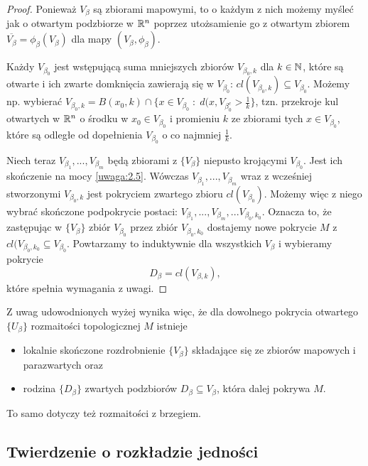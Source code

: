 \begin{proof}
  Ponieważ $V_\beta$ są zbiorami mapowymi, to o każdym z nich możemy myśleć jak o otwartym podzbiorze w $\mathbb{R}^n$ poprzez utożsamienie go z otwartym zbiorem $\overline{V_\beta}=\phi_\beta(V_\beta)$ dla mapy $(V_\beta, \phi_\beta)$.

  Każdy $V_{\beta_0}$ jest wstępującą suma mniejszych zbiorów $V_{\beta_0,k}$ dla $k\in\mathbb{N}$, które są otwarte i ich zwarte domknięcia zawierają się w $V_{\beta_0}$: $cl(V_{\beta_0,k})\subseteq V_{\beta_0}$. Możemy np. wybierać $V_{\beta_0,k}=B(x_0, k)\cap \{x\in V_{\beta_0}\;:\;d(x, V_{\beta_0^c}>\frac{1}{k}\}$, tzn. przekroje kul otwartych w $\mathbb{R}^n$ o środku w $x_0\in V_{\beta_0}$ i promieniu $k$ ze zbiorami tych $x\in V_{\beta_0}$, które są odległe od dopełnienia $V_{\beta_0}$ o co najmniej $\frac{1}{k}$.

  Niech teraz $V_{\beta_1},...,V_{\beta_m}$ będą zbiorami z $\{V_\beta\}$ niepusto krojącymi $V_{\beta_0}$. Jest ich skończenie na mocy \ref{uwaga:2.5}. Wówczas $V_{\beta_1},...,V_{\beta_m}$ wraz z wcześniej stworzonymi $V_{\beta_0,k}$ jest pokryciem zwartego zbioru $cl(V_{\beta_0})$. Możemy więc z niego wybrać skończone podpokrycie postaci: $V_{\beta_1},...,V_{\beta_m},...V_{\beta_0,k_0}$. Oznacza to, że zastępując w $\{V_\beta\}$ zbiór $V_{\beta_0}$ przez zbiór $V_{\beta_0, k_0}$ dostajemy nowe pokrycie $M$ z $cl(V_{\beta_0,k_0}\subseteq V_{\beta_0}$. Powtarzamy to induktywnie dla wszystkich $V_\beta$ i wybieramy pokrycie
  $$D_\beta=cl(V_{\beta, k}),$$
  które spełnia wymagania z uwagi.
\end{proof}

\begin{bbox}
Z uwag udowodnionych wyżej wynika więc, że dla dowolnego pokrycia otwartego $\{U_\beta\}$ rozmaitości topologicznej $M$ istnieje 
\begin{itemize}
  \item lokalnie skończone rozdrobnienie $\{V_\beta\}$ składające się ze zbiorów mapowych i parazwartych oraz
  \item rodzina $\{D_\beta\}$ zwartych podzbiorów $D_\beta\subseteq V_\beta$, która dalej pokrywa $M$.
\end{itemize}

To samo dotyczy też rozmaitości z brzegiem.
\end{bbox}

\subsection{Twierdzenie o rozkładzie jedności}

